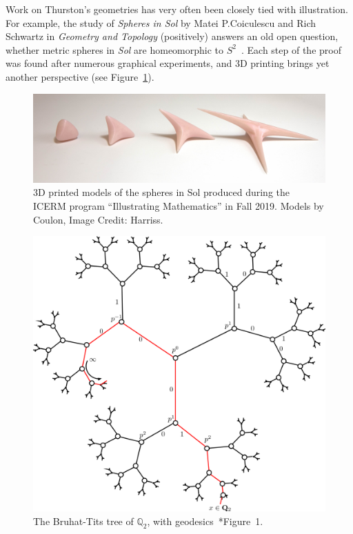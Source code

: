 \documentclass{notices}
\begin{document}
Work on Thurston's geometries has very often been closely tied with illustration. For example, the study of \emph{Spheres in Sol} by Matei P.\@ Coiculescu and Rich Schwartz in \emph{Geometry and Topology} (positively) answers an old open question, whether metric spheres in \emph{Sol} are homeomorphic to $S^2$~\cite{coiculescu2022sol}. Each step of the proof was found after numerous graphical experiments, and 3D printing brings yet another perspective (see Figure~\ref{fig:sol spheres}).

\begin{figure}
    \includegraphics[width=\textwidth]{images/spheres_sol.jpg}
    \caption{3D printed models of the spheres in Sol produced during the ICERM program ``Illustrating Mathematics'' in Fall 2019.
    Models by Coulon, Image Credit: Harriss.}
    \label{fig:sol spheres}
\end{figure}

\begin{figure}
    \includegraphics[width=1.\linewidth]{images/bruhatTits.png}
    \caption{The Bruhat-Tits tree of $\mathbb{Q}_2$, with geodesics~\cite{HMMS17}*{Figure~1}.}
    \label{fig:bruhatTits}
\end{figure}
\end{document}

